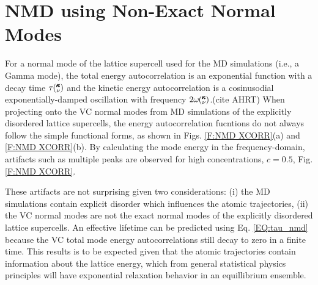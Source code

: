 \documentclass[aps,prb,onecolumn,preprint,footinbib,superscriptaddress,amsmath,amssymb,floatfix]{revtex4}
\newcommand{\kv}{\mspace{-4.0mu}\left(\mspace{-8.0mu}
\begin{smallmatrix}&\pmb{\kappa} \\&\nu\end{smallmatrix}
\mspace{-3.0mu}\right)}
\begin{document}

\section{\label{A:NMD XCORR}
NMD using Non-Exact Normal Modes}

For a normal mode of the lattice supercell 
used for the MD simulations (i.e., a Gamma mode), 
the total energy autocorrelation is an exponential function  
with a decay time $\tau\kv$ and the kinetic energy autocorrelation is a 
cosinusodial exponentially-damped oscillation with frequency 
$2\omega\kv$.(cite AHRT)   
When projecting onto the VC normal modes from MD simulations  
of the explicitly disordered lattice supercells, 
the energy autocorrelation fucntions 
do not always follow the simple functional forms, 
as shown in Figs. \ref{F:NMD XCORR}(a) and \ref{F:NMD XCORR}(b). 
By calculating the mode energy in the  
frequency-domain,\cite{larkin_comparison_2012} artifacts such as 
multiple peaks are observed for high concentrations,  
$c=0.5$, Fig. \ref{F:NMD XCORR}.   

These artifacts are not surprising given two considerations: 
(i) the MD simulations 
contain explicit disorder which influences the atomic trajectories, 
(ii)
the VC normal modes are not the exact normal modes of the 
explicitly disordered lattice supercells. 
An effective lifetime can be predicted 
using Eq. \eqref{EQ:tau_nmd} 
because the VC total mode energy autocorrelations 
still decay to zero in a finite time. This results is to be expected 
given that the atomic trajectories contain 
information about the lattice energy, which from general statistical 
physics principles will have exponential relaxation behavior in an 
equillibrium ensemble.
\cite{srivastava_physics_1990,landau_statistical_1980,
rajabpour_thermal_2010}
\end{document}
